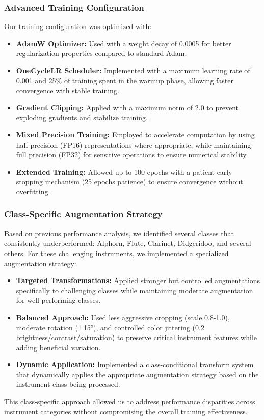\subsubsection{Advanced Training Configuration}
Our training configuration was optimized with:

\begin{itemize}
    \item \textbf{AdamW Optimizer:} Used with a weight decay of 0.0005 for better regularization properties compared to standard Adam.
    
    \item \textbf{OneCycleLR Scheduler:} Implemented with a maximum learning rate of 0.001 and 25\% of training spent in the warmup phase, allowing faster convergence with stable training.
    
    \item \textbf{Gradient Clipping:} Applied with a maximum norm of 2.0 to prevent exploding gradients and stabilize training.
    
    \item \textbf{Mixed Precision Training:} Employed to accelerate computation by using half-precision (FP16) representations where appropriate, while maintaining full precision (FP32) for sensitive operations to ensure numerical stability.
    
    \item \textbf{Extended Training:} Allowed up to 100 epochs with a patient early stopping mechanism (25 epochs patience) to ensure convergence without overfitting.
\end{itemize}

\subsubsection{Class-Specific Augmentation Strategy}
Based on previous performance analysis, we identified several classes that consistently underperformed: Alphorn, Flute, Clarinet, Didgeridoo, and several others. For these challenging instruments, we implemented a specialized augmentation strategy:

\begin{itemize}
    \item \textbf{Targeted Transformations:} Applied stronger but controlled augmentations specifically to challenging classes while maintaining moderate augmentation for well-performing classes.
    
    \item \textbf{Balanced Approach:} Used less aggressive cropping (scale 0.8-1.0), moderate rotation (±15°), and controlled color jittering (0.2 brightness/contrast/saturation) to preserve critical instrument features while adding beneficial variation.
    
    \item \textbf{Dynamic Application:} Implemented a class-conditional transform system that dynamically applies the appropriate augmentation strategy based on the instrument class being processed.
\end{itemize}

This class-specific approach allowed us to address performance disparities across instrument categories without compromising the overall training effectiveness.
